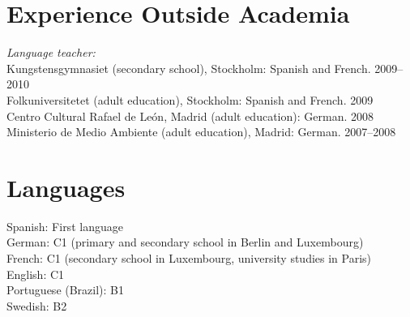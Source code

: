 \documentclass[margin, 11pt]{res} %
\begin{document}
\begin{resume}
 
\section{\sc Experience Outside Academia}

\textsl{Language teacher:} \\
Kungstensgymnasiet (secondary school), Stockholm: Spanish  and French. 2009--2010 \\
Folkuniversitetet (adult education), Stockholm: Spanish and French. 2009 \\
Centro Cultural Rafael de Le\'{o}n, Madrid (adult education): German. 2008 \\ 
Ministerio de Medio Ambiente (adult education), Madrid: German. 2007--2008 \\ 







\section{\sc Languages}

Spanish: First language \\
German: C1 (primary and secondary school in Berlin and Luxembourg)\\
French: C1 (secondary school in Luxembourg, university studies in Paris)\\
English: C1\\
Portuguese (Brazil): B1\\
Swedish: B2\\



\end{resume}
\end{document}
